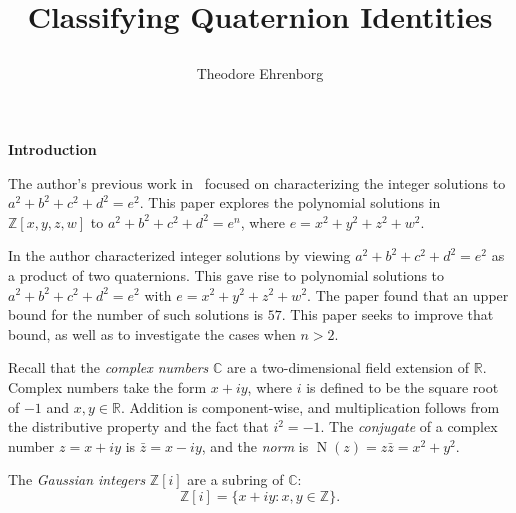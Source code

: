 \documentclass[12pt,table]{article}
\numberwithin{equation}{section}
\newcommand{\MySpacing}{25}
\newcommand{\MyFontSize}{20}
\newcommand{\MySectionSpacing}{15}
\newcommand{\MySectionFontSize}{40}
\DeclareMathOperator{\N}{N}
\newcommand{\Ccc}{\mathbb C}
\newcommand{\Rrr}{\mathbb R}
\newcommand{\Zzz}{\mathbb Z}
\begin{document}
\begin{landscape}

\bf
{
\title
{
\fontsize{120}{150}\selectfont%
\begin{center}
\textbf { Classifying Quaternion Identities }
\end{center}
}
}
\author{
\fontsize{50}{50}\selectfont
\sc Theodore Ehrenborg}
\date{}
\maketitle

\newpage

{\fontsize{\MyFontSize}{\MySpacing}\selectfont%
{


\noindent
\begin{center}
{\fontsize{\MySectionFontSize}{\MySectionSpacing}\selectfont \textbf
 {Introduction}
}
\end{center}

\fontsize{\MyFontSize}{\MySpacing}\selectfont







The author's previous work in~\cite{Ehrenborg_2018}
focused on characterizing the
integer solutions to
$a^2 + b^2 + c^2 + d^2 = e^2$.
This paper explores the polynomial solutions
in $ \Zzz[x,y,z,w] $ to
$a^2 + b^2 + c^2 + d^2 = e^n$, where
$e = x^2 + y^2 + z^2 + w^2$.

In \cite{Ehrenborg_2018} the author characterized integer
solutions by viewing $a^2 + b^2 + c^2 + d^2 = e^2$
as a product of two quaternions. This gave
rise to polynomial solutions to
$a^2 + b^2 + c^2 + d^2 = e^2$
with $e = x^2 + y^2 + z^2 + w^2$.
The paper found that an upper bound for the number
of such solutions is $57$. This paper seeks to
improve that bound, as well as to investigate
the cases when $n > 2$.



Recall that the \emph{complex numbers} $\Ccc$ are a two-dimensional
field extension of $\Rrr$.
Complex numbers take the form $x + iy$, where $i$ is defined to be the
square root of $-1$ and $x,y \in \Rrr$.
Addition is component-wise, and multiplication
follows from the distributive property and the fact that
$i^2 = -1$.
The \emph{conjugate} of a complex number $ z = x + iy$ is $ \bar{z} = x - iy$, and  
the \emph{norm} is $ \N(z) = z \bar{z} = x^2 + y^2$.  

The \emph{Gaussian integers} $ \Zzz[i] $ are a subring of $\Ccc$:
\[
\Zzz[i] = \{ x + iy: x,y \in \Zzz \}.
\]



}}
\end{landscape}
\end{document}
